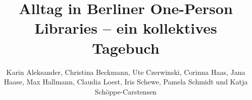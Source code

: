 
\fancyhead[R]{\thepage} %

\title{\LARGE{Alltag in Berliner One-Person Libraries -- ein kollektives Tagebuch}} %
\author{\parbox{10cm}{Karin Aleksander, Christina Beckmann, Ute Czerwinski, Corinna Haas, Jana Haase, Max Hallmann, Claudia Loest, Iris Schewe, Pamela Schmidt und Katja Schöppe-Carstensen}} %

\setcounter{page}{1}
